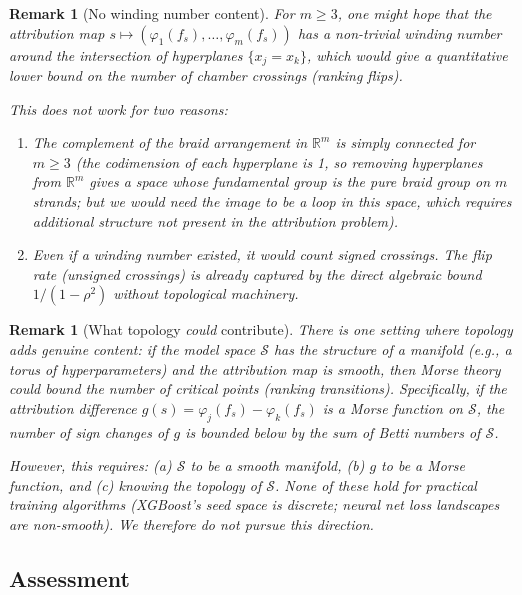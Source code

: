 \documentclass{article}
\newtheorem{remark}[theorem]{Remark}
\begin{document}
\begin{remark}[No winding number content]
For $m \geq 3$, one might hope that the attribution map
$s \mapsto (\varphi_1(f_s), \ldots, \varphi_m(f_s))$ has a
non-trivial winding number around the intersection of hyperplanes
$\{x_j = x_k\}$, which would give a \emph{quantitative} lower
bound on the number of chamber crossings (ranking flips).

This does not work for two reasons:
\begin{enumerate}
    \item The complement of the braid arrangement in
      $\mathbb{R}^m$ is simply connected for $m \geq 3$
      (the codimension of each hyperplane is 1, so removing
      hyperplanes from $\mathbb{R}^m$ gives a space whose
      fundamental group is the pure braid group on $m$ strands;
      but we would need the image to be a \emph{loop} in this
      space, which requires additional structure not present in
      the attribution problem).
    \item Even if a winding number existed, it would count
      \emph{signed} crossings. The flip rate (unsigned crossings)
      is already captured by the direct algebraic bound
      $1/(1-\rho^2)$ without topological machinery.
\end{enumerate}
\end{remark}

\begin{remark}[What topology \emph{could} contribute]
There is one setting where topology adds genuine content: if the
model space $\mathcal{S}$ has the structure of a manifold (e.g.,
a torus of hyperparameters) and the attribution map is smooth,
then Morse theory could bound the number of critical points
(ranking transitions). Specifically, if the attribution difference
$g(s) = \varphi_j(f_s) - \varphi_k(f_s)$ is a Morse function on
$\mathcal{S}$, the number of sign changes of $g$ is bounded below
by the sum of Betti numbers of $\mathcal{S}$.

However, this requires: (a) $\mathcal{S}$ to be a smooth manifold,
(b) $g$ to be a Morse function, and (c) knowing the topology of
$\mathcal{S}$. None of these hold for practical training algorithms
(XGBoost's seed space is discrete; neural net loss landscapes are
non-smooth). We therefore do not pursue this direction.
\end{remark}

\subsection{Assessment}
\end{document}
